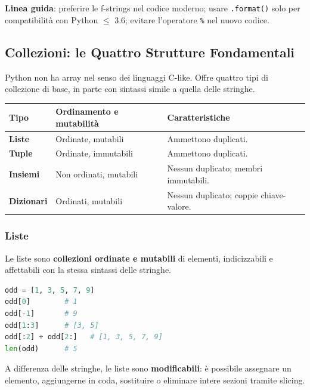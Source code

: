 \documentclass[12pt]{extarticle}
\begin{document}
\noindent \textbf{Linea guida}: preferire le f-strings nel codice moderno; usare \texttt{.format()} solo per compatibilità con Python $\le$ 3.6; evitare l'operatore \texttt{\%} nel nuovo codice.

\subsection{Collezioni: le Quattro Strutture Fondamentali}

\noindent Python non ha array nel senso dei linguaggi C-like. Offre quattro tipi di collezione di base, in parte con sintassi simile a quella delle stringhe.

\begin{center}
\small
\begin{tabular}{p{2.8cm}p{3.4cm}p{8cm}}
    \toprule
    \textbf{Tipo} & \textbf{Ordinamento e mutabilità} & \textbf{Caratteristiche} \\
    \midrule
    \textbf{Liste} & Ordinate, mutabili & Ammettono duplicati. \\
    \addlinespace
    \textbf{Tuple} & Ordinate, immutabili & Ammettono duplicati. \\
    \addlinespace
    \textbf{Insiemi} & Non ordinati, mutabili & Nessun duplicato; membri immutabili. \\
    \addlinespace
    \textbf{Dizionari} & Ordinati, mutabili & Nessun duplicato; coppie chiave-valore. \\
    \bottomrule
\end{tabular}
\end{center}

\subsubsection{Liste}

\noindent Le liste sono \textbf{collezioni ordinate e mutabili} di elementi, indicizzabili e affettabili con la stessa sintassi delle stringhe.

\begin{lstlisting}[language=Python]
odd = [1, 3, 5, 7, 9]
odd[0]        # 1
odd[-1]       # 9
odd[1:3]      # [3, 5]
odd[:2] + odd[2:]   # [1, 3, 5, 7, 9]
len(odd)      # 5
\end{lstlisting}

\noindent A differenza delle stringhe, le liste sono \textbf{modificabili}: è possibile assegnare un elemento, aggiungerne in coda, sostituire o eliminare intere sezioni tramite slicing.
\end{document}
